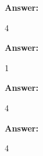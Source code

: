 \documentclass[12pt,twoside]{article}
\newcommand{\answer}{
 \par\medskip
 \textbf{Answer:}
}
\newcommand{\answerIb}{ \answer
4
}
\newcommand{\answerIc}{ \answer
1
}
\newcommand{\answerId}{ \answer
4
}
\newcommand{\answerIe}{ \answer
4
}
\begin{document}
\begin{problems}
\begin{problemparts}
\begin{problemparts}
\answerIb
    
\answerIc 

\answerId

\answerIe
\end{problemparts}



\end{problemparts}
\end{problems}
\end{document}
